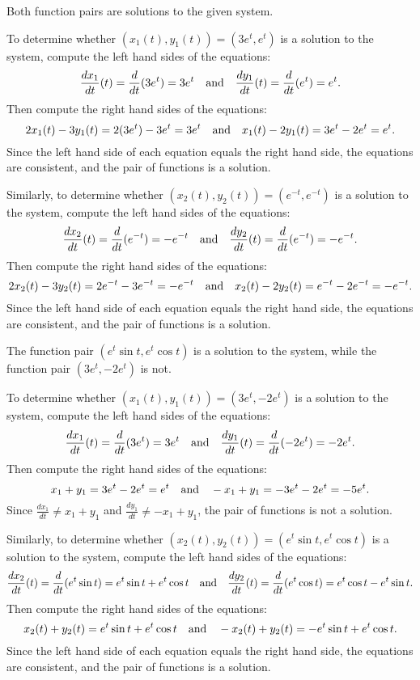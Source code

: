 \documentclass{ximera}
\begin{document}
 \ans Both function pairs are solutions to the given system.

\soln To determine whether $(x_1(t),y_1(t)) = (3e^t, e^t)$ is
a solution to the system, compute the left hand sides of the equations:
\[
\frac{dx_1}{dt}(t) = \frac{d}{dt}(3e^t) = 3e^t \quad\mbox{and}\quad
\frac{dy_1}{dt}(t) = \frac{d}{dt}(e^t) = e^t.
\]
Then compute the right hand sides of the equations:
\[
2x_1(t) - 3y_1(t) = 2(3e^t) - 3e^t = 3e^t \quad\mbox{and}\quad
x_1(t) - 2y_1(t) = 3e^t - 2e^t = e^t.
\]
Since the left hand side of each equation equals the right hand side, the
equations are consistent, and the pair of functions is a solution.

\para Similarly, to determine whether $(x_2(t),y_2(t)) = (e^{-t},e^{-t})$
is a solution to the system, compute the left hand sides of the equations:
\[
\frac{dx_2}{dt}(t) = \frac{d}{dt}(e^{-t}) = -e^{-t} \quad\mbox{and}\quad
\frac{dy_2}{dt}(t) = \frac{d}{dt}(e^{-t}) = -e^{-t}.
\]
Then compute the right hand sides of the equations:
\[
2x_2(t) - 3y_2(t) = 2e^{-t} - 3e^{-t} = -e^{-t} \quad\mbox{and}\quad
x_2(t) - 2y_2(t) = e^{-t} - 2e^{-t} = -e^{-t}.
\]
Since the left hand side of each equation equals the right hand side, the
equations are consistent, and the pair of functions is a solution.


 \ans The function pair $(e^t\sin{t},e^t\cos{t})$ is a
solution to the system, while the function pair $(3e^t,-2e^t)$ is not.

\soln To determine whether $(x_1(t),y_1(t)) = (3e^t,-2e^t)$ is
a solution to the system, compute the left hand sides of the equations:
\[
\frac{dx_1}{dt}(t) = \frac{d}{dt}(3e^t) = 3e^t \quad\mbox{and}\quad
\frac{dy_1}{dt}(t) = \frac{d}{dt}(-2e^t) = -2e^t.
\]
Then compute the right hand sides of the equations:
\[
x_1 + y_1 = 3e^t - 2e^t = e^t \quad\mbox{and}\quad
-x_1 + y_1 = -3e^t - 2e^t = -5e^t.
\]
Since $\frac{dx_1}{dt} \neq x_1 + y_1$ and $\frac{dy_1}{dt} \neq -x_1 + y_1$,
the pair of functions is not a solution.

\para Similarly, to determine whether $(x_2(t),y_2(t)) =
(e^t\sin{t},e^t\cos{t})$ is a solution to the system, compute the left
hand sides of the equations:
\[
\frac{dx_2}{dt}(t) = \frac{d}{dt}(e^t\sin{t}) = 
e^t\sin{t} + e^t\cos{t} \quad\mbox{and}\quad
\frac{dy_2}{dt}(t) = \frac{d}{dt}(e^t\cos{t}) =
e^t\cos{t} - e^t\sin{t}.
\]
Then compute the right hand sides of the equations:
\[
x_2(t) + y_2(t) = e^t\sin{t} + e^t\cos{t} \quad\mbox{and}\quad
-x_2(t) + y_2(t) = -e^t\sin{t} + e^t\cos{t}.
\]
Since the left hand side of each equation equals the right hand side, the
equations are consistent, and the pair of functions is a solution.
\end{document}
